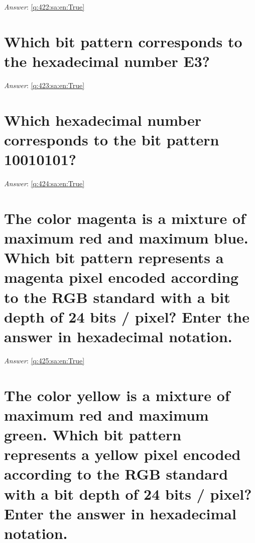 \documentclass[a4paper,11pt,oneside]{book}
\begin{document}
\begin{sloppypar}
\textit{Answer}: \autoref{q:422:sa:en:True}



\section{Which bit pattern corresponds to the hexadecimal number E3?}

\label{q:423:sa:en:False}

\vspace{2cm}

\noindent\makebox[\textwidth]{\hrulefill}

\vspace{1cm}

\textit{Answer}: \autoref{q:423:sa:en:True}



\section{Which hexadecimal number corresponds to the bit pattern 10010101?}

\label{q:424:sa:en:False}

\vspace{2cm}

\noindent\makebox[\textwidth]{\hrulefill}

\vspace{1cm}

\textit{Answer}: \autoref{q:424:sa:en:True}



\section{The color magenta is a mixture of maximum red and maximum blue. Which bit pattern represents a magenta pixel encoded according to the RGB standard with a bit depth of 24 bits / pixel? Enter the answer in hexadecimal notation.}

\label{q:425:sa:en:False}

\vspace{2cm}

\noindent\makebox[\textwidth]{\hrulefill}

\vspace{1cm}

\textit{Answer}: \autoref{q:425:sa:en:True}



\section{The color yellow is a mixture of maximum red and maximum green. Which bit pattern represents a yellow pixel encoded according to the RGB standard with a bit depth of 24 bits / pixel? Enter the answer in hexadecimal notation.}


\end{sloppypar}
\end{document}
